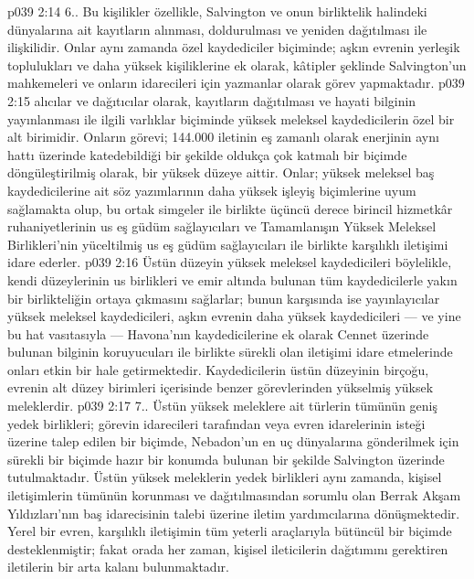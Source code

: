 \vs p039 2:14 6.\bibnobreakspace {}. Bu kişilikler özellikle, Salvington ve onun birliktelik halindeki dünyalarına ait kayıtların alınması, doldurulması ve yeniden dağıtılması ile ilişkilidir. Onlar aynı zamanda özel kaydediciler biçiminde; aşkın evrenin yerleşik toplulukları ve daha yüksek kişiliklerine ek olarak, kâtipler şeklinde Salvington’un mahkemeleri ve onların idarecileri için yazmanlar olarak görev yapmaktadır.
\vs p039 2:15  alıcılar ve dağıtıcılar olarak, kayıtların dağıtılması ve hayati bilginin yayınlanması ile ilgili varlıklar biçiminde yüksek meleksel kaydedicilerin özel bir alt birimidir. Onların görevi; 144.000 iletinin eş zamanlı olarak enerjinin aynı hattı üzerinde katedebildiği bir şekilde oldukça çok katmalı bir biçimde döngüleştirilmiş olarak, bir yüksek düzeye aittir. Onlar; yüksek meleksel baş kaydedicilerine ait söz yazımlarının daha yüksek işleyiş biçimlerine uyum sağlamakta olup, bu ortak simgeler ile birlikte üçüncü derece birincil hizmetkâr ruhaniyetlerinin us eş güdüm sağlayıcıları ve Tamamlanışın Yüksek Meleksel Birlikleri’nin yüceltilmiş us eş güdüm sağlayıcıları ile birlikte karşılıklı iletişimi idare ederler.
\vs p039 2:16 Üstün düzeyin yüksek meleksel kaydedicileri böylelikle, kendi düzeylerinin us birlikleri ve emir altında bulunan tüm kaydedicilerle yakın bir birlikteliğin ortaya çıkmasını sağlarlar; bunun karşısında ise yayınlayıcılar yüksek meleksel kaydedicileri, aşkın evrenin daha yüksek kaydedicileri --- ve yine bu hat vasıtasıyla --- Havona’nın kaydedicilerine ek olarak Cennet üzerinde bulunan bilginin koruyucuları ile birlikte sürekli olan iletişimi idare etmelerinde onları etkin bir hale getirmektedir. Kaydedicilerin üstün düzeyinin birçoğu, evrenin alt düzey birimleri içerisinde benzer görevlerinden yükselmiş yüksek meleklerdir.
\vs p039 2:17 7.\bibnobreakspace {}. Üstün yüksek meleklere ait türlerin tümünün geniş yedek birlikleri; görevin idarecileri tarafından veya evren idarelerinin isteği üzerine talep edilen bir biçimde, Nebadon’un en uç dünyalarına gönderilmek için sürekli bir biçimde hazır bir konumda bulunan bir şekilde Salvington üzerinde tutulmaktadır. Üstün yüksek meleklerin yedek birlikleri aynı zamanda, kişisel iletişimlerin tümünün korunması ve dağıtılmasından sorumlu olan Berrak Akşam Yıldızları’nın baş idarecisinin talebi üzerine iletim yardımcılarına dönüşmektedir. Yerel bir evren, karşılıklı iletişimin tüm yeterli araçlarıyla bütüncül bir biçimde desteklenmiştir; fakat orada her zaman, kişisel ileticilerin dağıtımını gerektiren iletilerin bir arta kalanı bulunmaktadır.
